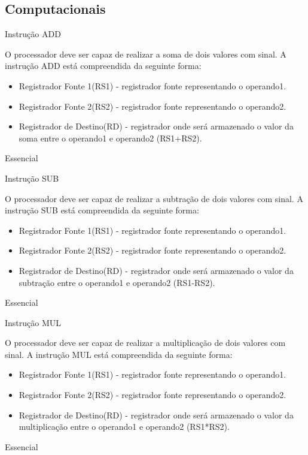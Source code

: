 \documentclass{article}
\begin{document}
    \subsection{Computacionais}
    \begin{functional}

     \requirement
      {Instrução ADD}
      {O processador deve ser capaz de realizar a soma de dois valores com sinal.
      A instrução ADD está compreendida da seguinte forma:
       \begin{itemize}
        \item Registrador Fonte 1(RS1) - registrador fonte representando o operando1.
        \item Registrador Fonte 2(RS2) - registrador fonte representando o operando2.
        \item Registrador de Destino(RD) - registrador onde será armazenado o valor da soma entre o operando1 e operando2 (RS1+RS2).
       \end{itemize}
       }
      {Essencial}

     \requirement
      {Instrução SUB}
      {O processador deve ser capaz de realizar a subtração de dois valores com sinal.
      A instrução SUB está compreendida da seguinte forma:
       \begin{itemize}
        \item Registrador Fonte 1(RS1) - registrador fonte representando o operando1.
        \item Registrador Fonte 2(RS2) - registrador fonte representando o operando2.
        \item Registrador de Destino(RD) - registrador onde será armazenado o valor da subtração entre o operando1 e operando2 (RS1-RS2).
       \end{itemize}
       }
      {Essencial}

      \requirement
      {Instrução MUL}
      {O processador deve ser capaz de realizar a multiplicação de dois valores com sinal.
      A instrução MUL está compreendida da seguinte forma:
       \begin{itemize}
        \item Registrador Fonte 1(RS1) - registrador fonte representando o operando1.
        \item Registrador Fonte 2(RS2) - registrador fonte representando o operando2.
        \item Registrador de Destino(RD) - registrador onde será armazenado o valor da multiplicação entre o operando1 e operando2 (RS1*RS2).
       \end{itemize}
       }
      {Essencial}


\end{functional}
\end{document}
